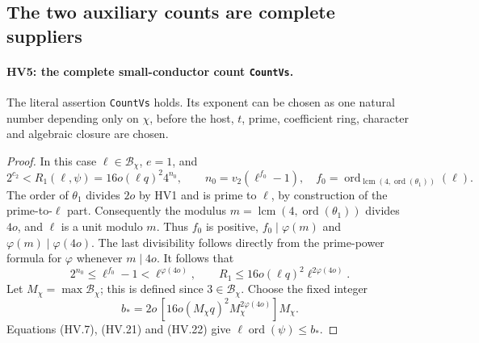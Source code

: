 \subsection{The two auxiliary counts are complete suppliers}

\paragraph{HV5: the complete small-conductor count \texttt{CountVs}.}
\label{claim:HV5}
The literal assertion \texttt{CountVs} holds.  Its exponent can
be chosen as one natural number depending only on $\chi$, before
the host, $t$, prime, coefficient ring, character and algebraic
closure are chosen.

\begin{proof}
In this case $\ell\in\mathcal B_\chi$, $e=1$, and
\[
 2^{c_2}<R_1(\ell,\psi)
      =16o(\ell q)^2 4^{n_0},\qquad
 n_0=v_2(\ell^{f_0}-1),\quad
 f_0=\operatorname{ord}_{\operatorname{lcm}(4,
                      \operatorname{ord}(\theta_1))}(\ell).
 \tag{HV.21}
\]
The order of $\theta_1$ divides $2o$ by HV1 and is prime to
$\ell$, by construction of the prime-to-$\ell$ part.
Consequently the modulus $m=\operatorname{lcm}(4,
\operatorname{ord}(\theta_1))$ divides $4o$, and $\ell$ is
a unit modulo $m$.  Thus $f_0$ is positive,
$f_0\mid\varphi(m)$ and $\varphi(m)\mid\varphi(4o)$.
The last divisibility follows directly from the prime-power
formula for $\varphi$ whenever $m\mid4o$.
It follows that
\[
 2^{n_0}\le\ell^{f_0}-1<\ell^{\varphi(4o)},\qquad
 R_1\le16o(\ell q)^2\ell^{2\varphi(4o)}.
 \tag{HV.22}
\]
Let $M_\chi=\max\mathcal B_\chi$; this is defined since
$3\in\mathcal B_\chi$.  Choose the fixed integer
\[
 b_* = 2o\,[16o(M_\chi q)^2M_\chi^{2\varphi(4o)}]M_\chi.
 \tag{HV.23}
\]
Equations (HV.7), (HV.21) and (HV.22) give
$\ell\operatorname{ord}(\psi)\le b_*$.


\end{proof}
